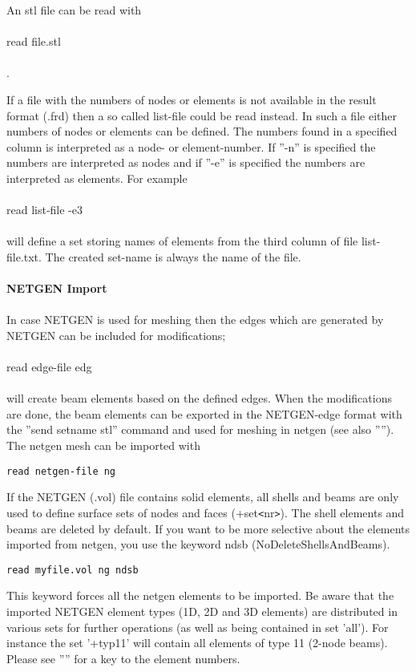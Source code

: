 \documentclass{article}
\begin{document}
An stl file can be read with \\\\read file.stl\\\\.

If a file with the numbers of nodes or elements is not available in the result format (.frd) then a so called list-file could be read instead. In such a file either numbers of nodes or elements can be defined. The numbers found in a specified column is interpreted as a node- or element-number. If ''-n'' is specified the numbers are interpreted as nodes and if ''-e'' is specified the numbers are interpreted as elements. For example\\\\read list-file -e3\\\\will define a set storing names of elements from the third column of file list-file.txt. The created set-name is always the name of the file.\\\\

\textbf{NETGEN Import}\\\\
In case NETGEN is used for meshing then the edges which are generated by NETGEN can be included for modifications;\\\\read edge-file edg\\\\will create beam elements based on the defined edges. When the modifications are done, the beam elements can be exported in the NETGEN-edge format with the ''send setname stl'' command and used for meshing in netgen (see also ''''). The netgen mesh can be imported with
\begin{verbatim}
read netgen-file ng
\end{verbatim}
If the NETGEN (.vol) file contains solid elements, all shells and beams are only used to define surface sets of nodes and faces (+set\verb_<_nr\verb_>_). The shell elements and beams are deleted by default. If you want to be more selective about the elements imported from netgen, you use the keyword ndsb (NoDeleteShellsAndBeams).
\begin{verbatim}
read myfile.vol ng ndsb
\end{verbatim}
This keyword forces all the netgen elements to be imported. Be aware that the imported NETGEN element types (1D, 2D and 3D elements) are distributed in various sets for further operations (as well as being contained in set 'all'). For instance the set '+typ11' will contain all elements of type 11 (2-node beams). Please see '''' for a key to the element numbers.\\\\
\end{document}
